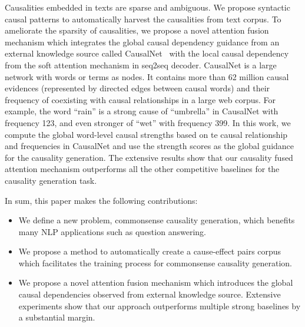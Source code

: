 Causalities embedded in texts are sparse and ambiguous. 
We propose syntactic causal patterns to automatically harvest the causalities from text corpus. 
To ameliorate the sparsity of causalities, we propose a novel attention fusion mechanism which integrates  the global causal dependency guidance from an external knowledge source called CausalNet~\cite{} with the local causal dependency from the soft attention mechanism in seq2seq decoder. CausalNet is a large network with words or terms as nodes. It contains more than 62 million causal evidences (represented by directed edges between causal words) and their frequency of coexisting with causal relationships in a large web corpus. For example, the word ``rain'' is a strong cause of ``umbrella'' in CausalNet with frequency 123, and even stronger of ``wet'' with frequency 399. In this work, we compute the global word-level causal strengths based on te causal relationship and frequencies in CausalNet and use the strength scores as the global guidance for the causality generation.
The extensive results show that our causality fused attention mechanism outperforms all the other competitive baselines for the causality generation task.

In sum, this paper makes the following contributions:
\begin{itemize}
	\item We define a new problem, commonsense causality generation, which benefits many NLP applications such as question answering.
	\item We propose a method to automatically create a cause-effect pairs corpus which facilitates the training process for commonsense causality generation.
	\item We propose a novel attention fusion mechanism which introduces the global causal dependencies observed from external knowledge source. Extensive experiments show that our approach outperforms multiple strong baselines by a substantial margin.
\end{itemize}



